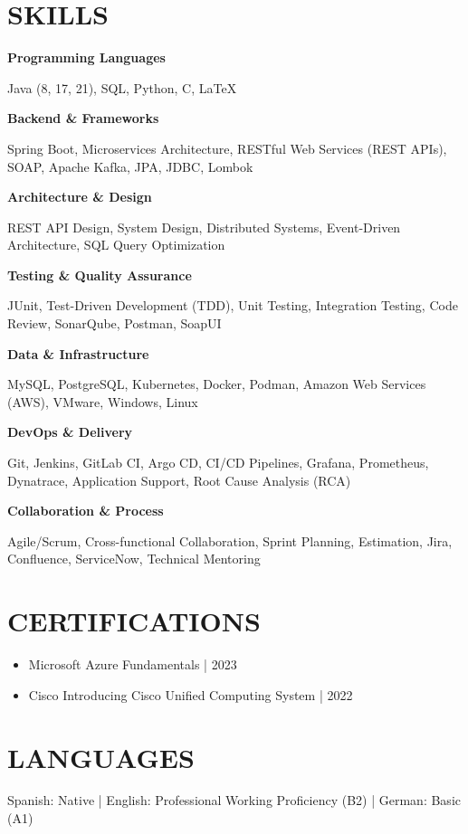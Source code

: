 \documentclass[10pt,a4paper]{article}
\newlength{\singleseparation}
\newcommand{\skill}[1]{
  \vspace{\singleseparation} 
  {\bfseries #1 \par}
  \nopagebreak}
\begin{document}
\section*{SKILLS}
\skill{Programming Languages}
Java (8, 17, 21), SQL, Python, C, LaTeX \par
\skill{Backend \& Frameworks}
Spring Boot, Microservices Architecture, RESTful Web Services (REST APIs), SOAP, Apache Kafka, JPA, JDBC, Lombok \par
\skill{Architecture \& Design}
REST API Design, System Design, Distributed Systems, Event-Driven Architecture, SQL Query Optimization \par
\skill{Testing \& Quality Assurance}
JUnit, Test-Driven Development (TDD), Unit Testing, Integration Testing, Code Review, SonarQube, Postman, SoapUI \par
\skill{Data \& Infrastructure}
MySQL, PostgreSQL, Kubernetes, Docker, Podman, Amazon Web Services (AWS), VMware, Windows, Linux \par
\skill{DevOps \& Delivery}
Git, Jenkins, GitLab CI, Argo CD, CI/CD Pipelines, Grafana, Prometheus, Dynatrace, Application Support, Root Cause Analysis (RCA) \par
\skill{Collaboration \& Process}
Agile/Scrum, Cross-functional Collaboration, Sprint Planning, Estimation, Jira, Confluence, ServiceNow, Technical Mentoring \par

\section*{CERTIFICATIONS}
\vspace{\singleseparation}
\begin{itemize}
  \item Microsoft Azure Fundamentals | 2023
  \item Cisco Introducing Cisco Unified Computing System | 2022
\end{itemize}

\section*{LANGUAGES}
\vspace{\singleseparation}
Spanish: Native | English: Professional Working Proficiency (B2) | German: Basic (A1) \par
\end{document}
